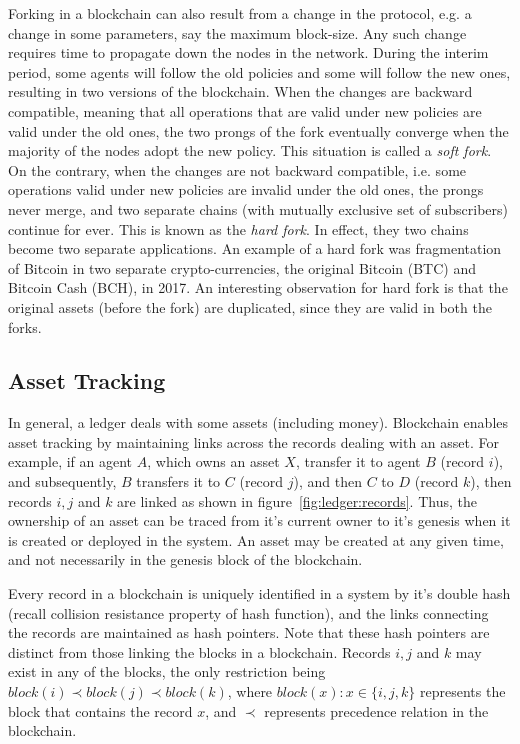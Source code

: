    
Forking in a blockchain can also result from a change in the protocol, e.g. a change in some parameters, say the maximum block-size. 
Any such change requires time to propagate down the nodes in the network. During the interim period, some agents will follow the old 
policies and some will follow the new ones, resulting in two versions of the blockchain. When the changes are backward compatible, 
meaning that all operations that are valid under new policies are valid under the old ones, the two prongs of the fork eventually 
converge when the majority of the nodes adopt the new policy. This situation is called a {\em soft fork}. On the 
contrary, when the changes are not backward compatible, i.e. some operations valid under new policies are invalid under the 
old ones, the prongs never merge, and two separate chains (with mutually exclusive set of subscribers) continue for ever. 
This is known as the {\em hard fork}. In effect, they two chains become two separate applications. An example of a hard fork 
was fragmentation of Bitcoin in two separate crypto-currencies, the original Bitcoin (BTC) and Bitcoin Cash (BCH), in 2017.
An interesting observation for hard fork is that the original assets (before the fork) are duplicated, since they are valid 
in both the forks.

\subsection{Asset Tracking}
\label{sec:ledger:tracking}

In general, a ledger deals with some assets (including money). Blockchain enables asset tracking by maintaining links across the 
records dealing with an asset. For example, if an agent $A$, which owns an asset $X$, transfer it to agent $B$ (record $i$), and 
subsequently, $B$  transfers it to $C$ (record $j$), and then $C$ to $D$ (record $k$), then records $i, j$ and $k$ are linked as 
shown in figure~\ref{fig:ledger:records}. Thus, the ownership of an asset can be traced from it's current owner to it's 
genesis when it is created or deployed in the system. An asset may be created at any given time, and not necessarily in 
the genesis block of the blockchain. 

Every record in a blockchain is uniquely identified in a system by it's double hash (recall collision resistance property of hash
function), and the links connecting the records are maintained as hash pointers. Note that these hash pointers are distinct from 
those linking the blocks in a blockchain. Records $i,j$ and $k$ may exist in any of the blocks, the only restriction being 
$block(i) \prec block(j) \prec block(k)$, where $block(x): x \in \{i,j,k\}$ represents the block that contains the record $x$, and 
$\prec$ represents precedence relation in the blockchain. 

